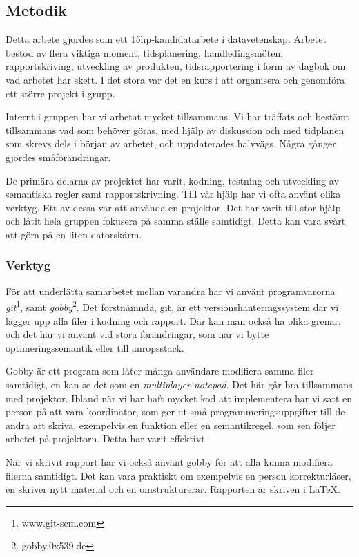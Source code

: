 \documentclass[../Appendix]{subfiles}
\begin{document}
\subsection{Metodik}

Detta arbete gjordes som ett 15hp-kandidatarbete i datavetenskap. Arbetet bestod
av flera viktiga moment,
    tidsplanering,
    handledingsmöten,
    rapportskriving,
    utveckling av produkten,
    tidsrapportering i form av dagbok om vad arbetet har skett. I det stora
var det en kurs i att organisera och genomföra ett större projekt i grupp.


Internt i gruppen har vi arbetat mycket tillsammans. Vi har träffats och
bestämt tillsammans vad som behöver göras, med hjälp av diskussion och med
tidplanen som skrevs dels i början av arbetet, och uppdaterades halvvägs. 
Några gånger gjordes småförändringar.

    De primära delarna av projektet har varit, kodning, testning och utveckling
av semantiska regler samt rapportskrivning. Till vår hjälp har vi ofta använt
olika verktyg. Ett av dessa var att använda en projektor. Det har varit till
stor hjälp och låtit hela gruppen fokusera på samma ställe samtidigt. Detta
kan vara svårt att göra på en liten datorskärm.

\subsubsection{Verktyg}

    För att underlätta samarbetet mellan varandra har vi använt programvarorna
\emph{git}\footnote{www.git-scm.com}, samt \emph{gobby}\footnote{gobby.0x539.de}.
Det förstnämnda, git, är ett versionshanteringssystem där vi lägger upp alla
filer i kodning och rapport. Där kan man också ha olika grenar, och det har 
vi använt vid stora förändringar, som när vi bytte optimeringssemantik eller
till anropsstack.

    Gobby är ett program som låter många användare modifiera samma filer
samtidigt, en kan se det som en \emph{multiplayer-notepad}. Det här går bra
tillsammans med projektor. Ibland när vi har haft mycket kod att implementera
har vi satt en person på att vara koordinator, som ger ut små
programmeringsuppgifter till de andra att skriva, exempelvis en funktion eller
en semantikregel, som sen följer arbetet på projektorn. Detta har varit 
effektivt.

    När vi skrivit rapport har vi också använt gobby för att alla kunna
modifiera filerna samtidigt. Det kan vara praktiskt om exempelvis en person
korrekturläser, en skriver nytt material och en omstrukturerar. Rapporten 
är skriven i \LaTeX.
\end{document}
